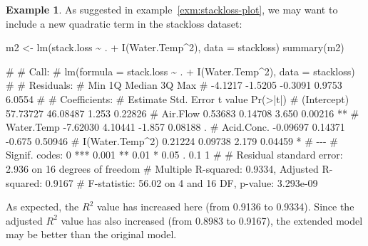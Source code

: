 \documentclass[
  a4paper,
]{article}
\newenvironment{Shaded}{\begin{snugshade}}{\end{snugshade}}
\newcommand{\AttributeTok}[1]{\textcolor[rgb]{0.77,0.63,0.00}{#1}}
\newcommand{\DecValTok}[1]{\textcolor[rgb]{0.00,0.00,0.81}{#1}}
\newcommand{\FunctionTok}[1]{\textcolor[rgb]{0.00,0.00,0.00}{#1}}
\newcommand{\NormalTok}[1]{#1}
\newcommand{\OtherTok}[1]{\textcolor[rgb]{0.56,0.35,0.01}{#1}}
\newcommand{\SpecialCharTok}[1]{\textcolor[rgb]{0.00,0.00,0.00}{#1}}
\theoremstyle{definition}
\theoremstyle{definition}
\newtheorem{example}{Example}[section]
\theoremstyle{definition}
\theoremstyle{definition}
\theoremstyle{remark}
\begin{document}
\begin{example}
As suggested in example~\ref{exm:stackloss-plot}, we may want to
include a new quadratic term in the stackloss dataset:

\begin{Shaded}
\begin{Highlighting}[]
\NormalTok{m2 }\OtherTok{\textless{}{-}} \FunctionTok{lm}\NormalTok{(stack.loss }\SpecialCharTok{\textasciitilde{}}\NormalTok{ . }\SpecialCharTok{+} \FunctionTok{I}\NormalTok{(Water.Temp}\SpecialCharTok{\^{}}\DecValTok{2}\NormalTok{), }\AttributeTok{data =}\NormalTok{ stackloss)}
\FunctionTok{summary}\NormalTok{(m2)}
\end{Highlighting}
\end{Shaded}

\begin{Shaded}
\begin{Highlighting}[]
\NormalTok{\# }
\NormalTok{\# Call:}
\NormalTok{\# lm(formula = stack.loss \textasciitilde{} . + I(Water.Temp\^{}2), data = stackloss)}
\NormalTok{\# }
\NormalTok{\# Residuals:}
\NormalTok{\#     Min      1Q  Median      3Q     Max }
\NormalTok{\# {-}4.1217 {-}1.5205 {-}0.3091  0.9753  6.0554 }
\NormalTok{\# }
\NormalTok{\# Coefficients:}
\NormalTok{\#                 Estimate Std. Error t value Pr(\textgreater{}|t|)   }
\NormalTok{\# (Intercept)     57.73727   46.08487   1.253  0.22826   }
\NormalTok{\# Air.Flow         0.53683    0.14708   3.650  0.00216 **}
\NormalTok{\# Water.Temp      {-}7.62030    4.10441  {-}1.857  0.08188 . }
\NormalTok{\# Acid.Conc.      {-}0.09697    0.14371  {-}0.675  0.50946   }
\NormalTok{\# I(Water.Temp\^{}2)  0.21224    0.09738   2.179  0.04459 * }
\NormalTok{\# {-}{-}{-}}
\NormalTok{\# Signif. codes:  0 \textquotesingle{}***\textquotesingle{} 0.001 \textquotesingle{}**\textquotesingle{} 0.01 \textquotesingle{}*\textquotesingle{} 0.05 \textquotesingle{}.\textquotesingle{} 0.1 \textquotesingle{} \textquotesingle{} 1}
\NormalTok{\# }
\NormalTok{\# Residual standard error: 2.936 on 16 degrees of freedom}
\NormalTok{\# Multiple R{-}squared:  0.9334,  Adjusted R{-}squared:  0.9167 }
\NormalTok{\# F{-}statistic: 56.02 on 4 and 16 DF,  p{-}value: 3.293e{-}09}
\end{Highlighting}
\end{Shaded}

As expected, the \(R^2\) value has increased here (from 0.9136 to 0.9334).
Since the adjusted \(R^2\) value has also increased (from 0.8983 to 0.9167),
the extended model may be better than the original model.
\end{example}
\end{document}
